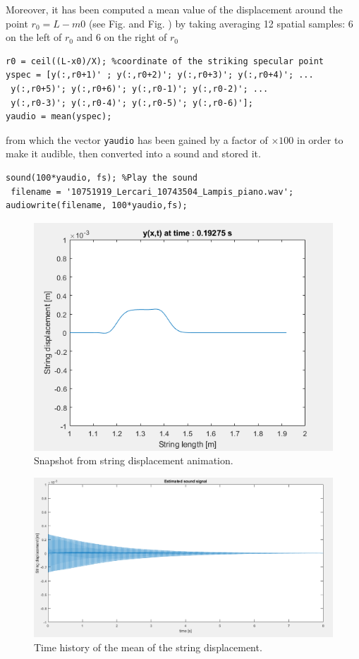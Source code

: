 \documentclass[a4paper]{article}
\begin{document}
Moreover, it has been computed a mean value of the displacement around the point $r_0 = L - m0$ (see Fig. and Fig. ) by taking averaging 12 spatial samples: 6 on the left of $r_0$ and 6 on the right of $r_0$

\begin{verbatim}
r0 = ceil((L-x0)/X); %coordinate of the striking specular point
yspec = [y(:,r0+1)' ; y(:,r0+2)'; y(:,r0+3)'; y(:,r0+4)'; ...
 y(:,r0+5)'; y(:,r0+6)'; y(:,r0-1)'; y(:,r0-2)'; ...
 y(:,r0-3)'; y(:,r0-4)'; y(:,r0-5)'; y(:,r0-6)'];
yaudio = mean(yspec);
\end{verbatim}

from which the vector \verb|yaudio| has been gained by a factor of $\times 100$ in order to make it audible, then converted into a sound and stored it.

\begin{verbatim}
sound(100*yaudio, fs); %Play the sound
 filename = '10751919_Lercari_10743504_Lampis_piano.wav';
audiowrite(filename, 100*yaudio,fs); 
\end{verbatim}

 \begin{figure}[h]
	\centering
	\includegraphics[width=0.75\linewidth]{displacement.png}
	\caption{Snapshot from string displacement animation.}
	\label{fig:displ}
\end{figure}

 \begin{figure}[h]
	\centering
	\includegraphics[width=0.75\linewidth]{sound_two.png}
	\caption{Time history of the mean of the string displacement.}
	\label{fig:historyone}
\end{figure}
\end{document}
